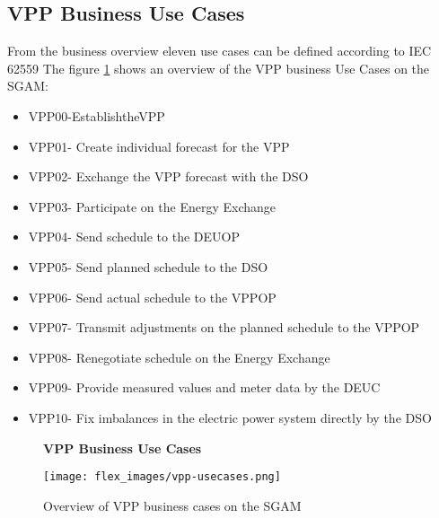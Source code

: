 \documentclass[nonacm,sigconf,12pt]{acmart}
\begin{document}
\subsection*{VPP Business Use Cases} 
From the business overview eleven use cases can be defined according to IEC 62559\cite{integratingthesmartgridsaustria_2017_technical} \cite{systems_use} The figure \ref{fig:vppUsescases} shows an overview of the VPP business Use Cases on the SGAM:
\begin{itemize}
    \item VPP00-EstablishtheVPP
    \item VPP01- Create individual forecast for the VPP
    \item VPP02- Exchange the VPP forecast with the DSO
    \item VPP03- Participate on the Energy Exchange
    \item VPP04- Send schedule to the DEUOP
    \item VPP05- Send planned schedule to the DSO
    \item VPP06- Send actual schedule to the VPPOP
    \item VPP07- Transmit adjustments on the planned schedule to the VPPOP
    \item VPP08- Renegotiate schedule on the Energy Exchange
    \item VPP09- Provide measured values and meter data by the DEUC
    \item VPP10- Fix imbalances in the electric power system directly by the DSO
\end{itemize}

\begin{figure}
 \textbf{VPP Business Use Cases}\par\medskip
 \texttt{[image: flex\_images/vpp-usecases.png]}
 \caption{Overview of VPP business cases on the SGAM}
 \label{fig:vppUsescases}
\end{figure}
\end{document}
